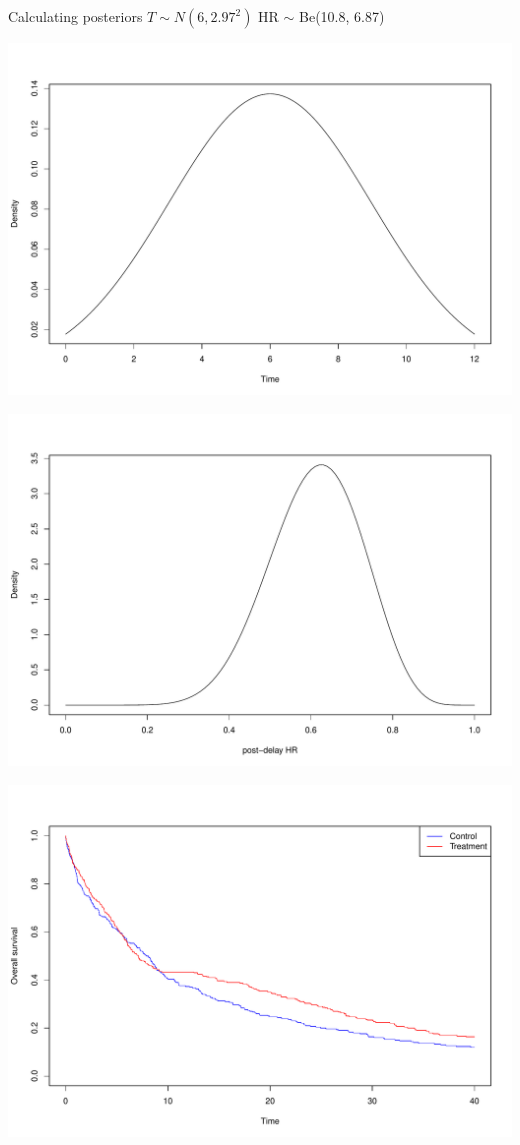 \documentclass[
  ignorenonframetext,
]{beamer}
\begin{document}
\begin{frame}{Calculating posteriors}
\protect\hypertarget{calculating-posteriors}{}
\(T \sim N(6, 2.97^2)\) HR \(\sim\) Be(10.8, 6.87)

\includegraphics{DTEInterim_files/figure-beamer/priors-1.pdf}

\includegraphics{DTEInterim_files/figure-beamer/prior HR-1.pdf}

\includegraphics{DTEInterim_files/figure-beamer/data-1.pdf}


\end{frame}
\end{document}
